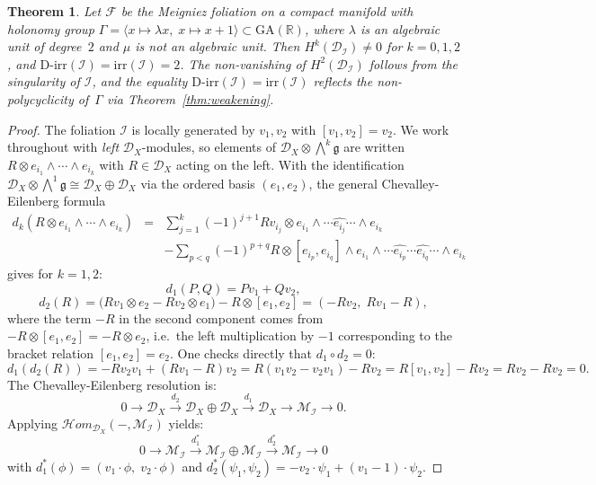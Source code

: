 \documentclass[12pt,a4paper]{article}
\newtheorem{theorem}{Theorem}[section]
\begin{document}
\begin{theorem}\label{thm:meigniez}
Let $\mathcal{F}$ be the Meigniez foliation on a compact manifold with
holonomy group
$\Gamma = \langle x \mapsto \lambda x,\; x \mapsto x+1 \rangle
\subset \mathrm{GA}(\mathbb{R})$,
where $\lambda$ is an algebraic unit of degree~$2$ and $\mu$ is not an
algebraic unit. Then $H^k(\mathcal{D}_{\mathcal{I}}) \neq 0$ for
$k = 0,1,2$, and
$\mathrm{D\text{-}irr}(\mathcal{I}) = \mathrm{irr}(\mathcal{I}) = 2$.
The non-vanishing of $H^2(\mathcal{D}_{\mathcal{I}})$ follows from the
singularity of $\mathcal{I}$, and the equality
$\mathrm{D\text{-}irr}(\mathcal{I}) = \mathrm{irr}(\mathcal{I})$
reflects the non-polycyclicity of~$\Gamma$ via
Theorem~\ref{thm:weakening}.
\end{theorem}

\begin{proof}
The foliation $\mathcal{I}$ is locally generated by $v_1, v_2$ with
$[v_1,v_2]=v_2$. We work throughout with \emph{left} $\mathcal{D}_X$-modules, so elements
of $\mathcal{D}_X \otimes \bigwedge^k\mathfrak{g}$ are written $R \otimes
e_{i_1}\wedge\cdots\wedge e_{i_k}$ with $R \in \mathcal{D}_X$ acting on
the left. With the identification
$\mathcal{D}_X \otimes \bigwedge^1\mathfrak{g}
\cong \mathcal{D}_X \oplus \mathcal{D}_X$ via the ordered basis $(e_1, e_2)$,
the general Chevalley-Eilenberg formula
\begin{eqnarray*}
d_k(R \otimes e_{i_1}\wedge\cdots\wedge e_{i_k})
&=& \sum_{j=1}^k (-1)^{j+1} Rv_{i_j}
  \otimes e_{i_1}\wedge\cdots\widehat{e_{i_j}}\cdots\wedge e_{i_k}\\
&&- \sum_{p<q}(-1)^{p+q} R
  \otimes [e_{i_p},e_{i_q}]
  \wedge e_{i_1}\wedge\cdots
  \widehat{e_{i_p}}\cdots\widehat{e_{i_q}}\cdots\wedge e_{i_k}
\end{eqnarray*}
gives for $k=1,2$:
$$
d_1(P,Q) = Pv_1 + Qv_2,
$$
$$
d_2(R) = \bigl(Rv_1 \otimes e_2 - Rv_2 \otimes e_1\bigr)
         - R \otimes [e_1,e_2]
= (-Rv_2,\; Rv_1 - R),
$$
where the term $-R$ in the second component comes from
$-R\otimes[e_1,e_2] = -R\otimes e_2$, i.e.\ the left multiplication by
$-1$ corresponding to the bracket relation $[e_1,e_2]=e_2$.
One checks directly that $d_1 \circ d_2 = 0$:
\[
d_1(d_2(R))
= -Rv_2 v_1 + (Rv_1 - R)v_2
= R(v_1 v_2 - v_2 v_1) - Rv_2
= R[v_1,v_2] - Rv_2
= Rv_2 - Rv_2 = 0.
\]
The Chevalley-Eilenberg resolution is:
\[
0 \to \mathcal{D}_X \xrightarrow{d_2}
\mathcal{D}_X \oplus \mathcal{D}_X \xrightarrow{d_1}
\mathcal{D}_X \to \mathcal{M}_{\mathcal{I}} \to 0.
\]
Applying
$\mathcal{H}om_{\mathcal{D}_X}(-,\mathcal{M}_{\mathcal{I}})$
yields:
\[
0 \to \mathcal{M}_{\mathcal{I}} \xrightarrow{d_1^*}
\mathcal{M}_{\mathcal{I}} \oplus \mathcal{M}_{\mathcal{I}}
\xrightarrow{d_2^*} \mathcal{M}_{\mathcal{I}} \to 0
\]
with $d_1^*(\phi) = (v_1 \cdot \phi,\; v_2 \cdot \phi)$ and
$d_2^*(\psi_1, \psi_2) = -v_2 \cdot \psi_1 + (v_1 - 1) \cdot \psi_2$.


\end{proof}
\end{document}
